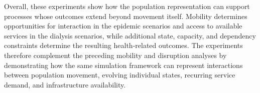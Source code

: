 Overall, these experiments show how the population representation can support processes whose outcomes extend beyond movement itself. Mobility determines opportunities for interaction in the epidemic scenarios and access to available services in the dialysis scenarios, while additional state, capacity, and dependency constraints determine the resulting health-related outcomes. The experiments therefore complement the preceding mobility and disruption analyses by demonstrating how the same simulation framework can represent interactions between population movement, evolving individual states, recurring service demand, and infrastructure availability.